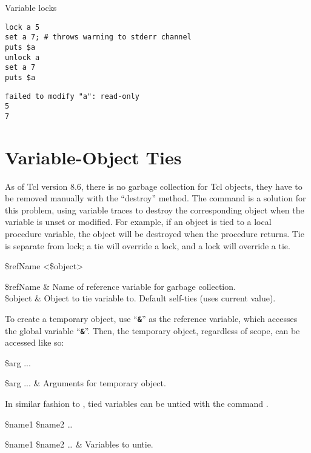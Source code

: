 \documentclass{article}
\begin{document}
\begin{example}{Variable locks}
\begin{lstlisting}
lock a 5
set a 7; # throws warning to stderr channel
puts $a
unlock a
set a 7
puts $a
\end{lstlisting}
\tcblower
\begin{lstlisting}
failed to modify "a": read-only
5
7
\end{lstlisting}
\end{example}

\clearpage

\section{Variable-Object Ties}
As of Tcl version 8.6, there is no garbage collection for Tcl objects, they have to be removed manually with the ``destroy'' method. 
The command  is a solution for this problem, using variable traces to destroy the corresponding object when the variable is unset or modified. 
For example, if an object is tied to a local procedure variable, the object will be destroyed when the procedure returns.
Tie is separate from lock; a tie will override a lock, and a lock will override a tie. 

\begin{syntax}
 \$refName <\$object>
\end{syntax}
\begin{args}
\$refName & Name of reference variable for garbage collection. \\
\$object & Object to tie variable to. Default self-ties (uses current value).
\end{args}

To create a temporary object, use ``\textbf{\texttt{\&}}'' as the reference variable, which accesses the global variable ``\textbf{\texttt{\&}}''.
Then, the temporary object, regardless of scope, can be accessed like so: 

\begin{syntax}
\command{\$\&} \$arg ...
\end{syntax}
\begin{args}
\$arg ... & Arguments for temporary object.
\end{args}

In similar fashion to , tied variables can be untied with the command .
\begin{syntax}
 \$name1 \$name2 …
\end{syntax}
\begin{args}
\$name1 \$name2 … & Variables to untie.
\end{args}
\end{document}
